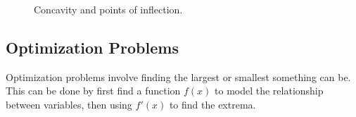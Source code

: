 \documentclass[12pt]{article}
\begin{document}
\begin{figure}[H]
	\begin{center}
		\caption{Concavity and points of inflection.}
		\label{fig:concavityinflection}
	\end{center}
\end{figure}

\subsection{Optimization Problems}
Optimization problems involve finding the largest or smallest something can be. This can be done by first find a function $f(x)$ to model the relationship between variables, then using $f'(x)$ to find the extrema.
\end{document}
